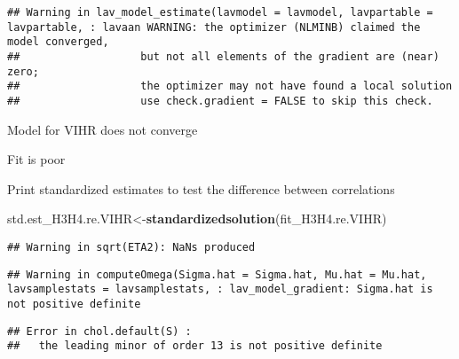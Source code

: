 \documentclass[
]{article}
\newenvironment{Shaded}{\begin{snugshade}}{\end{snugshade}}
\newcommand{\KeywordTok}[1]{\textcolor[rgb]{0.13,0.29,0.53}{\textbf{#1}}}
\newcommand{\NormalTok}[1]{#1}
\newcommand{\OperatorTok}[1]{\textcolor[rgb]{0.81,0.36,0.00}{\textbf{#1}}}
\newcommand{\StringTok}[1]{\textcolor[rgb]{0.31,0.60,0.02}{#1}}
\begin{document}
\begin{verbatim}
## Warning in lav_model_estimate(lavmodel = lavmodel, lavpartable = lavpartable, : lavaan WARNING: the optimizer (NLMINB) claimed the model converged,
##                   but not all elements of the gradient are (near) zero;
##                   the optimizer may not have found a local solution
##                   use check.gradient = FALSE to skip this check.
\end{verbatim}

Model for VIHR does not converge

Fit is poor

Print standardized estimates to test the difference between correlations

\begin{Shaded}
\begin{Highlighting}[]
\NormalTok{std.est_H3H4.re.VIHR<-}\KeywordTok{standardizedsolution}\NormalTok{(fit_H3H4.re.VIHR)}
\end{Highlighting}
\end{Shaded}

\begin{verbatim}
## Warning in sqrt(ETA2): NaNs produced
\end{verbatim}

\begin{verbatim}
## Warning in computeOmega(Sigma.hat = Sigma.hat, Mu.hat = Mu.hat, lavsamplestats = lavsamplestats, : lav_model_gradient: Sigma.hat is not positive definite
\end{verbatim}

\begin{verbatim}
## Error in chol.default(S) : 
##   the leading minor of order 13 is not positive definite
\end{verbatim}

\begin{Shaded}
\end{Shaded}
\end{document}
